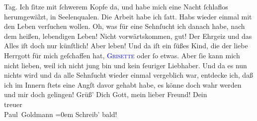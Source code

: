                Tag. Ich ſitze mit ſchwerem
               Kopfe da, und habe mich
               eine Nacht ſchlaflos
               herumgewälzt, in Seelenqualen. Die Arbeit habe
               ich ſatt. Habs wieder
               einmal mit den
               Leben verſuchen wollen.
               Oh, was für eine Sehnſucht
               ich danach habe, nach
               dem heißen, lebendigen {\pb}Leben! Nicht vorwärtskommen,
            gut! Der Ehrgeiz und
            das Alles iſt doch nur
            künſtlich! Aber leben!
            Und da iſt ein ſüßes
            Kind, die der liebe
            Herrgott für mich
            geſchaffen hat, \textsc{\textcolor{blue}{Grisette}{}}
            oder ſo etwas. Aber ſie
            kann mich nicht lieben,
            weil ich nicht jung bin
            und kein ſeuriger Liebhaber.
            Und da es nun nichts wird
            und da alle Sehnſucht
            wieder einmal vergeblich
            war, entdecke ich,
            daß ich im Innern
            ſtets eine Angſt davor {\pb}gehabt habe,
               es könne doch wahr werden und mir doch gelingen! {\dotsfour}\pend
           \pstart
           Grüß’ Dich Gott, mein lieber Freund!\pend
           \pstart
           Dein {\\[\baselineskip]}treuer {\\[\baselineskip]}\spacefill\mbox{Paul Goldmann}\pend
           \leftskip=0em{}\pstart
           \noindent{}Schreib’ bald!\pend
           \endnumbering{}  
      